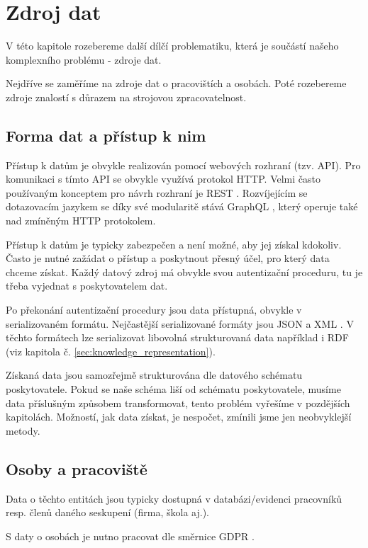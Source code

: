 \chapter{Zdroj dat} \label{chap:sources}
V této kapitole rozebereme další dílčí problematiku, která je součástí našeho komplexního problému - zdroje dat.\par
Nejdříve se zaměříme na zdroje dat o pracovištích a osobách. Poté rozebereme zdroje znalostí s důrazem na strojovou zpracovatelnost.\par

\section{Forma dat a přístup k nim}
Přístup k datům je obvykle realizován pomocí webových rozhraní (tzv. API). Pro komunikaci s tímto API se obvykle využívá protokol HTTP. Velmi často používaným konceptem pro návrh rozhraní je REST \cite{REST}. Rozvíjejícím se dotazovacím jazykem se díky své modularitě stává GraphQL \cite{GRAPHQL}, který operuje také nad zmíněným HTTP protokolem. \par
Přístup k datům je typicky zabezpečen a není možné, aby jej získal kdokoliv. Často je nutné zažádat o přístup a poskytnout přesný účel, pro který data chceme získat. Každý datový zdroj má obvykle svou autentizační proceduru, tu je třeba vyjednat s poskytovatelem dat.\par
Po překonání autentizační procedury jsou data přístupná, obvykle v serializovaném formátu. Nejčastější serializované formáty jsou JSON \cite{JSON} a XML \cite{XML}. V těchto formátech lze serializovat libovolná strukturovaná data například i RDF (viz kapitola č. \ref{sec:knowledge_representation}).\par
Získaná data jsou samozřejmě strukturována dle datového schématu poskytovatele. Pokud se naše schéma liší od schématu poskytovatele, musíme data příslušným způsobem transformovat, tento problém vyřešíme v pozdějších kapitolách. Možností, jak data získat, je nespočet, zmínili jsme jen neobvyklejší metody.

\section{Osoby a pracoviště}
Data o těchto entitách jsou typicky dostupná v databázi/evidenci pracovníků resp. členů daného seskupení (firma, škola aj.). \par
\noindent S daty o osobách je nutno pracovat dle směrnice GDPR \cite{GDPR}.




